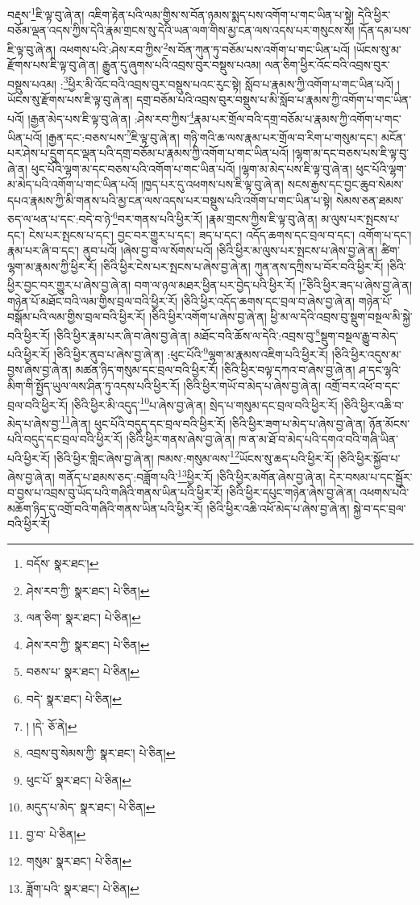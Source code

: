 བརྡས་\footnote{བདོས་  སྣར་ཐང་། }ཇི་ལྟ་བུ་ཞེ་ན། འཇིག་རྟེན་པའི་ལམ་གྱིས་ས་བོན་ཉམས་སྨད་པས་འགོག་པ་གང་ཡིན་པ་སྟེ། དེའི་ཕྱིར་བཅོམ་ལྡན་འདས་ཀྱིས་དེའི་རྣམ་གྲངས་སུ་དེའི་ཡན་ལག་གིས་མྱ་ངན་ལས་འདས་པར་གསུངས་སོ། །དོན་དམ་པས་ཇི་ལྟ་བུ་ཞེ་ན། འཕགས་པའི་:ཤེས་རབ་ཀྱིས་\footnote{ཤེས་རབ་ཀྱི་  སྣར་ཐང་།  པེ་ཅིན། }ས་བོན་ཀུན་ཏུ་བཅོམ་པས་འགོག་པ་གང་ཡིན་པའོ། །ཡོངས་སུ་མ་རྫོགས་པས་ཇི་ལྟ་བུ་ཞེ་ན། རྒྱུན་དུ་ཞུགས་པའི་འབྲས་བུར་བསྡུས་པའམ། ལན་ཅིག་ཕྱིར་འོང་བའི་འབྲས་བུར་བསྡུས་པའམ། :\footnote{ལན་ཅིག་  སྣར་ཐང་།  པེ་ཅིན། }ཕྱིར་མི་འོང་བའི་འབྲས་བུར་བསྡུས་པའང་རུང་སྟེ། སློབ་པ་རྣམས་ཀྱི་འགོག་པ་གང་ཡིན་པའོ། །ཡོངས་སུ་རྫོགས་པས་ཇི་ལྟ་བུ་ཞེ་ན། དགྲ་བཅོམ་པའི་འབྲས་བུར་བསྡུས་པ་མི་སློབ་པ་རྣམས་ཀྱི་འགོག་པ་གང་ཡིན་པའོ། །རྒྱན་མེད་པས་ཇི་ལྟ་བུ་ཞེ་ན། :ཤེས་རབ་ཀྱིས་\footnote{ཤེས་རབ་ཀྱི་  སྣར་ཐང་།  པེ་ཅིན། }རྣམ་པར་གྲོལ་བའི་དགྲ་བཅོམ་པ་རྣམས་ཀྱི་འགོག་པ་གང་ཡིན་པའོ། །རྒྱན་དང་:བཅས་པས་\footnote{བཅས་པ་  སྣར་ཐང་།  པེ་ཅིན། }ཇི་ལྟ་བུ་ཞེ་ན། གཉི་གའི་ཆ་ལས་རྣམ་པར་གྲོལ་བ་རིག་པ་གསུམ་དང་། མངོན་པར་ཤེས་པ་དྲུག་དང་ལྡན་པའི་དགྲ་བཅོམ་པ་རྣམས་ཀྱི་འགོག་པ་གང་ཡིན་པའོ། །ལྷག་མ་དང་བཅས་པས་ཇི་ལྟ་བུ་ཞེ་ན། ཕུང་པོའི་ལྷག་མ་དང་བཅས་པའི་འགོག་པ་གང་ཡིན་པའོ། །ལྷག་མ་མེད་པས་ཇི་ལྟ་བུ་ཞེ་ན། ཕུང་པོའི་ལྷག་མ་མེད་པའི་འགོག་པ་གང་ཡིན་པའོ། །ཁྱད་པར་དུ་འཕགས་པས་ཇི་ལྟ་བུ་ཞེ་ན། སངས་རྒྱས་དང་བྱང་ཆུབ་སེམས་དཔའ་རྣམས་ཀྱི་མི་གནས་པའི་མྱ་ངན་ལས་འདས་པར་བསྡུས་པའི་འགོག་པ་གང་ཡིན་པ་སྟེ། སེམས་ཅན་ཐམས་ཅད་ལ་ཕན་པ་དང་:བདེ་བ་ཉེ་\footnote{བདེ་  སྣར་ཐང་།  པེ་ཅིན། }བར་གནས་པའི་ཕྱིར་རོ། །རྣམ་གྲངས་ཀྱིས་ཇི་ལྟ་བུ་ཞེ་ན། མ་ལུས་པར་སྤངས་པ་དང་། ངེས་པར་སྤངས་པ་དང་། བྱང་བར་གྱུར་པ་དང་། ཟད་པ་དང་། འདོད་ཆགས་དང་བྲལ་བ་དང་། འགོག་པ་དང་། རྣམ་པར་ཞི་བ་དང་། ནུབ་པའོ། །ཞེས་བྱ་བ་ལ་སོགས་པའོ། །ཅིའི་ཕྱིར་མ་ལུས་པར་སྤངས་པ་ཞེས་བྱ་ཞེ་ན། ཚིག་ལྷག་མ་རྣམས་ཀྱི་ཕྱིར་རོ། །ཅིའི་ཕྱིར་ངེས་པར་སྤངས་པ་ཞེས་བྱ་ཞེ་ན། ཀུན་ནས་དཀྲིས་པ་བོར་བའི་ཕྱིར་རོ། །ཅིའི་ཕྱིར་བྱང་བར་གྱུར་པ་ཞེས་བྱ་ཞེ་ན། བག་ལ་ཉལ་མཐར་ཕྱིན་པར་བྱེད་པའི་ཕྱིར་རོ། །\footnote{། །དེ་  ཅོ་ནེ། }ཅིའི་ཕྱིར་ཟད་པ་ཞེས་བྱ་ཞེ་ན། གཉེན་པོ་མཐོང་བའི་ལམ་གྱིས་བྲལ་བའི་ཕྱིར་རོ། །ཅིའི་ཕྱིར་འདོད་ཆགས་དང་བྲལ་བ་ཞེས་བྱ་ཞེ་ན། གཉེན་པོ་བསྒོམ་པའི་ལམ་གྱིས་བྲལ་བའི་ཕྱིར་རོ། །ཅིའི་ཕྱིར་འགོག་པ་ཞེས་བྱ་ཞེ་ན། ཕྱི་མ་ལ་དེའི་འབྲས་བུ་སྡུག་བསྔལ་མི་སྐྱེ་བའི་ཕྱིར་རོ། །ཅིའི་ཕྱིར་རྣམ་པར་ཞི་བ་ཞེས་བྱ་ཞེ་ན། མཐོང་བའི་ཆོས་ལ་དེའི་:འབྲས་བུ་\footnote{འབྲས་བུ་སེམས་ཀྱི་  སྣར་ཐང་།  པེ་ཅིན། }སྡུག་བསྔལ་རྒྱུ་བ་མེད་པའི་ཕྱིར་རོ། །ཅིའི་ཕྱིར་ནུབ་པ་ཞེས་བྱ་ཞེ་ན། :ཕུང་པོའི་\footnote{ཕུང་པོ་  སྣར་ཐང་།  པེ་ཅིན། }ལྷག་མ་རྣམས་འཇིག་པའི་ཕྱིར་རོ། །ཅིའི་ཕྱིར་འདུས་མ་བྱས་ཞེས་བྱ་ཞེ་ན། མཚན་ཉིད་གསུམ་དང་བྲལ་བའི་ཕྱིར་རོ། །ཅིའི་ཕྱིར་བལྟ་དཀའ་བ་ཞེས་བྱ་ཞེ་ན། ཤ་དང་ལྷའི་མིག་གི་སྤྱོད་ཡུལ་ལས་ཤིན་ཏུ་འདས་པའི་ཕྱིར་རོ། །ཅིའི་ཕྱིར་གཡོ་བ་མེད་པ་ཞེས་བྱ་ཞེ་ན། འགྲོ་བར་འཕོ་བ་དང་བྲལ་བའི་ཕྱིར་རོ། །ཅིའི་ཕྱིར་མི་འདུད་\footnote{མདུད་པ་མེད་  སྣར་ཐང་།  པེ་ཅིན། }པ་ཞེས་བྱ་ཞེ་ན། སྲེད་པ་གསུམ་དང་བྲལ་བའི་ཕྱིར་རོ། །ཅིའི་ཕྱིར་འཆི་བ་མེད་པ་ཞེས་བྱ་\footnote{བྱ་བ་  པེ་ཅིན། }ཞེ་ན། ཕུང་པོའི་བདུད་དང་བྲལ་བའི་ཕྱིར་རོ། །ཅིའི་ཕྱིར་ཟག་པ་མེད་པ་ཞེས་བྱ་ཞེ་ན། ཉོན་མོངས་པའི་བདུད་དང་བྲལ་བའི་ཕྱིར་རོ། །ཅིའི་ཕྱིར་གནས་ཞེས་བྱ་ཞེ་ན། ཁ་ན་མ་ཐོ་བ་མེད་པའི་དགའ་བའི་གཞི་ཡིན་པའི་ཕྱིར་རོ། །ཅིའི་ཕྱིར་གླིང་ཞེས་བྱ་ཞེ་ན། ཁམས་:གསུམ་ལས་\footnote{གསུམ་  སྣར་ཐང་།  པེ་ཅིན། }ཡོངས་སུ་ཆད་པའི་ཕྱིར་རོ། །ཅིའི་ཕྱིར་སྐྱོབ་པ་ཞེས་བྱ་ཞེ་ན། གནོད་པ་ཐམས་ཅད་:བཟློག་པའི་\footnote{ཟློག་པའི་  སྣར་ཐང་།  པེ་ཅིན། }ཕྱིར་རོ། །ཅིའི་ཕྱིར་མགོན་ཞེས་བྱ་ཞེ་ན། དེར་བསམ་པ་དང་སྦྱོར་བ་བྱས་པ་འབྲས་བུ་ཡོད་པའི་གཞིའི་གནས་ཡིན་པའི་ཕྱིར་རོ། །ཅིའི་ཕྱིར་དཔུང་གཉེན་ཞེས་བྱ་ཞེ་ན། འཕགས་པའི་མཆོག་ཉིད་དུ་འགྲོ་བའི་གཞིའི་གནས་ཡིན་པའི་ཕྱིར་རོ། །ཅིའི་ཕྱིར་འཆི་འཕོ་མེད་པ་ཞེས་བྱ་ཞེ་ན། སྐྱེ་བ་དང་བྲལ་བའི་ཕྱིར་རོ། 
